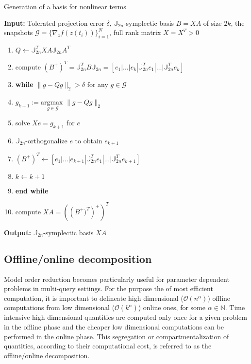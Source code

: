 \begin{algorithm} 
\caption{Generation of a basis for nonlinear terms} \label{alg:3}
{\bf Input:} Tolerated projection error $\delta$, $\mathbb J_{2n}$-symplectic basis $B = X A$ of size $2k$, the snapshots $\mathcal G = \{ \nabla_zf(z(t_i))\}_{i=1}^{N}$, full rank matrix $X=X^T>0$
\begin{enumerate}
\item $Q \leftarrow \mathbb J_{2n}^T X A \mathbb J_{2n}A^T$
\item compute $(B^+)^T = \mathbb J_{2n}^T B \mathbb J_{2n} = [e_1|\dots |e_{k} | \mathbb J_{2n}^Te_1|\dots| \mathbb J_{2n}^Te_{k}]$
\item \textbf{while} $\| g - Q g \|_2 > \delta$ for any $g \in \mathcal G$
\item \hspace{0.5cm} $g_{k+1} := \underset{g\in \mathcal G}{\text{argmax }} \| g -  Q g  \|_2$
\item \hspace{0.5cm} solve $X e = g_{k+1}$ for $e$
\item \hspace{0.5cm} $\mathbb J_{2n}$-orthogonalize $e$ to obtain $e_{k+1}$
\item \hspace{0.5cm} $(B^+)^T \leftarrow [e_1|\dots |e_{k+1} | \mathbb J_{2n}^Te_1|\dots| \mathbb J_{2n}^Te_{k+1}]$
\item \hspace{0.5cm} $k \leftarrow k+1$
\item \textbf{end while}
\item compute $XA = \left( \left (B^+)^T \right)^+ \right)^T$
\end{enumerate}
\vspace{0.5cm}
{\bf Output:} $\mathbb J_{2n}$-symplectic basis $XA$
\end{algorithm}

\subsection{Offline/online decomposition} \label{sec:normmor.4}
Model order reduction becomes particularly useful for parameter dependent problems in multi-query settings. For the purpose the of most efficient computation, it is important to delineate high dimensional ($\mathcal{O}(n^{\alpha})$) offline computations from low dimensional ($\mathcal{O}(k^{\alpha})$) online ones, for some $\alpha \in \mathbb N$. Time intensive high dimensional quantities are computed only once for a given problem in the offline phase and the cheaper low dimensional computations can be performed in the online phase. This segregation or compartmentalization of quantities, according to their computational cost, is referred to as the offline/online decomposition.

